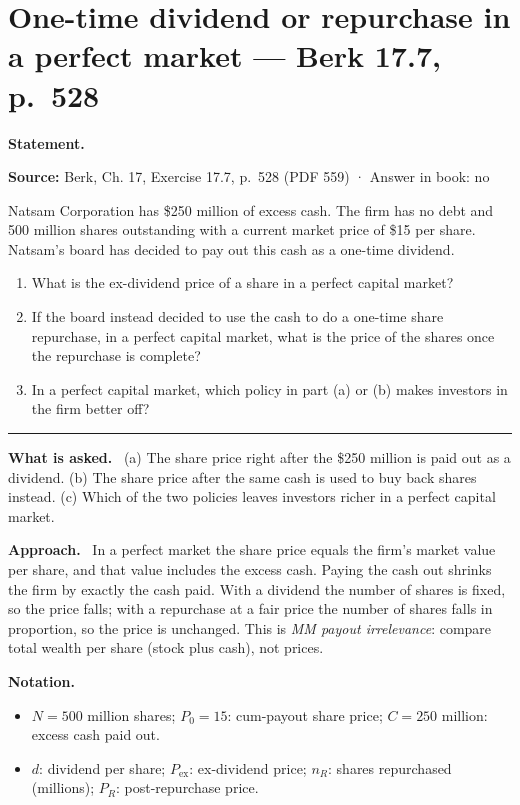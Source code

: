 \documentclass[11pt,a4paper]{article}
\numberwithin{equation}{section}
\newcommand{\notation}{\par\smallskip\noindent\textbf{Notation.}}
\newcommand{\asked}{\par\medskip\noindent\textbf{What is asked.}~}
\newcommand{\approach}{\par\smallskip\noindent\textbf{Approach.}~}
\newcommand{\stmtbegin}{\par\medskip\noindent\textbf{Statement.}\par\nopagebreak\begingroup\small\setlength{\tabcolsep}{3pt}\sloppy}
\newcommand{\stmtend}{\par\endgroup\nopagebreak\noindent\rule{\linewidth}{0.4pt}\par\medskip}
\begin{document}
\section{One-time dividend or repurchase in a perfect market --- Berk 17.7, p.~528}
\stmtbegin
\textbf{Source:} Berk, Ch. 17, Exercise 17.7, p.~528 (PDF 559) · Answer in book: no

Natsam Corporation has \$250 million of excess cash. The firm has no debt and 500 million shares
outstanding with a current market price of \$15 per share. Natsam's board has decided to pay out
this cash as a one-time dividend.

\begin{enumerate}
\def\labelenumi{\alph{enumi}.}
\item
  What is the ex-dividend price of a share in a perfect capital market?
\item
  If the board instead decided to use the cash to do a one-time share repurchase, in a perfect
  capital market, what is the price of the shares once the repurchase is complete?
\item
  In a perfect capital market, which policy in part (a) or (b) makes investors in the firm better
  off?
\end{enumerate}
\stmtend

\asked
(a) The share price right after the \$250 million is paid out as a dividend.
(b) The share price after the same cash is used to buy back shares instead.
(c) Which of the two policies leaves investors richer in a perfect capital market.

\approach
In a perfect market the share price equals the firm's market value per share, and that value
includes the excess cash. Paying the cash out shrinks the firm by exactly the cash paid. With a
dividend the number of shares is fixed, so the price falls; with a repurchase at a fair price
the number of shares falls in proportion, so the price is unchanged. This is \emph{MM payout
irrelevance}: compare total wealth per share (stock plus cash), not prices.

\notation
\begin{itemize}
  \item $N=500$ million shares; $P_0=15$: cum-payout share price; $C=250$ million: excess cash paid out.
  \item $d$: dividend per share; $P_{\text{ex}}$: ex-dividend price; $n_R$: shares repurchased (millions); $P_R$: post-repurchase price.
\end{itemize}
\end{document}
